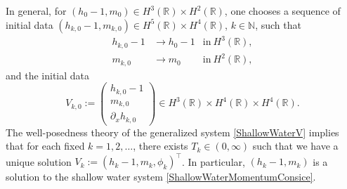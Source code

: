 \documentclass[reqno,11pt]{amsart}
\theoremstyle{plain}
\theoremstyle{definition}
\numberwithin{equation}{section}
\begin{document}
In general, for $ (h_0-1, m_0) \in H^3(\mathbb R) \times H^2(\mathbb R) $, one chooses a sequence of initial data $ (h_{k,0} - 1, m_{k,0}) \in H^5(\mathbb R) \times H^4(\mathbb R)$, $ k \in \mathbb N $, such that
\begin{equation}
\label{approximation_initial_k}
\begin{aligned}
    h_{k,0} - 1 & \rightarrow h_0 - 1  & \text{in} \ H^3(\mathbb R),\\
    m_{k,0} & \rightarrow m_0 & \text{in} \ H^2(\mathbb R), 
\end{aligned}
\end{equation}
and the initial data
\begin{equation}
    \label{V_k}
    V_{k,0} := \begin{pmatrix}
        h_{k,0} - 1 \\ m_{k,0} \\ \partial_x h_{k,0}
    \end{pmatrix} \in H^3(\mathbb{R}) \times H^4(\mathbb{R}) \times H^4(\mathbb{R}). 
\end{equation}
The well-posedness theory of the generalized system \eqref{ShallowWaterV} implies that for each fixed $k=1,2,\ldots$, there exists $ T_k \in (0,\infty) $ such that we have a unique solution $ V_k :=( h_k -1, m_k, \phi_k )^\top $. %
In particular, $ (h_k-1, m_k) $ is a solution to the shallow water system \eqref{ShallowWaterMomentumConsice}. 
\end{document}

